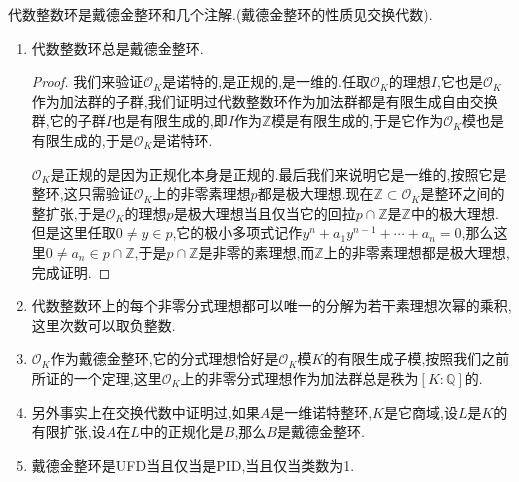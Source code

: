代数整数环是戴德金整环和几个注解.(戴德金整环的性质见交换代数).
\begin{enumerate}
	\item 代数整数环总是戴德金整环.
	\begin{proof}
		
		我们来验证$\mathscr{O}_K$是诺特的,是正规的,是一维的.任取$\mathscr{O}_K$的理想$I$,它也是$\mathscr{O}_K$作为加法群的子群,我们证明过代数整数环作为加法群都是有限生成自由交换群,它的子群$I$也是有限生成的,即$I$作为$\mathbb{Z}$模是有限生成的,于是它作为$\mathscr{O}_K$模也是有限生成的,于是$\mathscr{O}_K$是诺特环.
		
		$\mathscr{O}_K$是正规的是因为正规化本身是正规的.最后我们来说明它是一维的,按照它是整环,这只需验证$\mathscr{O}_K$上的非零素理想$p$都是极大理想.现在$\mathbb{Z}\subset\mathscr{O}_K$是整环之间的整扩张,于是$\mathscr{O}_K$的理想$p$是极大理想当且仅当它的回拉$p\cap\mathbb{Z}$是$\mathbb{Z}$中的极大理想.但是这里任取$0\not=y\in p$,它的极小多项式记作$y^n+a_1y^{n-1}+\cdots+a_n=0$,那么这里$0\not=a_n\in p\cap\mathbb{Z}$,于是$p\cap\mathbb{Z}$是非零的素理想,而$\mathbb{Z}$上的非零素理想都是极大理想,完成证明.
	\end{proof}
    \item 代数整数环上的每个非零分式理想都可以唯一的分解为若干素理想次幂的乘积,这里次数可以取负整数.
    \item $\mathscr{O}_K$作为戴德金整环,它的分式理想恰好是$\mathscr{O}_K$模$K$的有限生成子模,按照我们之前所证的一个定理,这里$\mathscr{O}_K$上的非零分式理想作为加法群总是秩为$[K:\mathbb{Q}]$的.
    \item 另外事实上在交换代数中证明过,如果$A$是一维诺特整环,$K$是它商域,设$L$是$K$的有限扩张,设$A$在$L$中的正规化是$B$,那么$B$是戴德金整环.
    \item 戴德金整环是UFD当且仅当是PID,当且仅当类数为1.
\end{enumerate}

